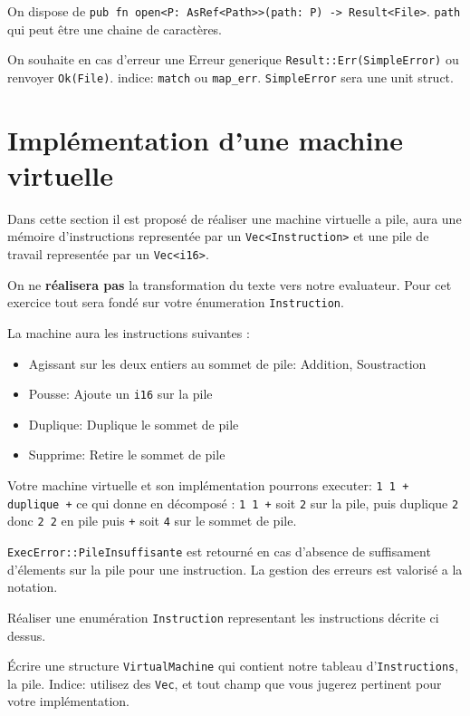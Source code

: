 \documentclass[11pt,a4paper,addpoint]{exam}
\begin{document}
\begin{questions}
On dispose de \texttt{pub fn open<P: AsRef<Path>>(path: P) -> Result<File>}.
\texttt{path} qui peut être une chaine de caractères.

On souhaite en cas d'erreur une Erreur generique \texttt{Result::Err(SimpleError)}  ou renvoyer \texttt{Ok(File)}. indice: \texttt{match} ou \texttt{map_err}.
\texttt{SimpleError} sera une unit struct.
\vspace{1in}

\section{Implémentation d'une machine virtuelle}

Dans cette section il est proposé de réaliser une machine virtuelle a pile, aura une mémoire d'instructions representée par un \texttt{Vec<Instruction>} et une pile de travail representée par un \texttt{Vec<i16>}.

On ne \textbf{réalisera pas} la transformation du texte vers notre evaluateur. Pour cet exercice tout sera fondé sur votre énumeration \texttt{Instruction}.

La machine aura les instructions suivantes :

\begin{itemize}
    \item Agissant sur les deux entiers au sommet de pile: Addition, Soustraction
    \item Pousse: Ajoute un \texttt{i16} sur la pile
    \item Duplique: Duplique le sommet de pile
    \item Supprime: Retire le sommet de pile
\end{itemize}

Votre machine virtuelle et son implémentation pourrons executer: \texttt{1 1 + duplique +} ce qui donne en décomposé : \texttt{1 1 +} soit \texttt{2} sur la pile, puis duplique \texttt{2} donc \texttt{2 2} en pile puis \texttt{+} soit \texttt{4} sur le sommet de pile.

\texttt{ExecError::PileInsuffisante} est retourné en cas d'absence de suffisament d'élements sur la pile pour une instruction.
La gestion des erreurs est valorisé a la notation.

\question[1] Réaliser une enumération \texttt{Instruction} representant les instructions décrite ci dessus.

\question[1] Écrire une structure \texttt{VirtualMachine} qui contient notre tableau d'\texttt{Instructions}, la pile.
Indice: utilisez des \texttt{Vec}, et tout champ que vous jugerez pertinent pour votre implémentation.


\end{questions}
\end{document}
